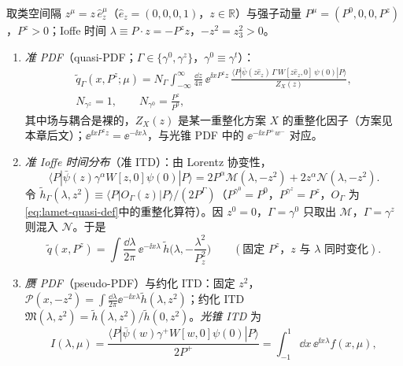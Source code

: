 \begin{definition}\label{def:lattice-quasi}
取类空间隔 $z^\mu=z\,\hat e_z^\mu$（$\hat e_z=(0,0,0,1)$，$z\in\mathbb R$）与强子动量 $P^\mu=(P^0,0,0,P^z)$，$P^z>0$；Ioffe 时间 $\lambda\equiv P\cdot z=-P^zz$，$-z^2=z_3^2>0$。
\begin{enumerate}[label=(\roman*),leftmargin=2em,itemsep=1pt,topsep=2pt]
\item \emph{准 PDF}（quasi-PDF；$\Gamma\in\{\gamma^0,\gamma^z\}$，$\gamma^0\equiv\gamma^t$）：
\begin{equation}\label{eq:lamet-quasi-def}
\begin{gathered}
\tilde q_\Gamma(x,P^z;\mu)=N_\Gamma\int_{-\infty}^{\infty}\frac{\dd z}{4\pi}\,\ee^{\ii xP^zz}\,\frac{\langle P|\bar\psi(z\hat e_z)\,\Gamma\,W[z\hat e_z,0]\,\psi(0)|P\rangle}{Z_X(z)},\\
N_{\gamma^z}=1,\qquad N_{\gamma^0}=\frac{P^z}{P^0},
\end{gathered}
\end{equation}
其中场与耦合是裸的，$Z_X(z)$ 是某一重整化方案 $X$ 的重整化因子（方案见本章后文）；$\ee^{\ii xP^zz}=\ee^{-\ii x\lambda}$，与光锥 PDF 中的 $\ee^{-\ii xP^+w^-}$ 对应。%
\item \emph{准 Ioffe 时间分布}（准 ITD）：由 Lorentz 协变性，
\[
\langle P|\bar\psi(z)\gamma^\alpha W[z,0]\psi(0)|P\rangle=2P^\alpha\mathcal M(\lambda,-z^2)+2z^\alpha\mathcal N(\lambda,-z^2).
\]
令 $\tilde h_\Gamma(\lambda,z^2)\equiv\langle P|O_\Gamma(z)|P\rangle/(2P^\Gamma)$（$P^{\gamma^0}=P^0$，$P^{\gamma^z}=P^z$，$O_\Gamma$ 为\cref{eq:lamet-quasi-def}中的重整化算符）。因 $z^0=0$，$\Gamma=\gamma^0$ 只取出 $\mathcal M$，$\Gamma=\gamma^z$ 则混入 $\mathcal N$。于是
\begin{equation}\label{eq:lamet-quasi-itd}
\tilde q(x,P^z)=\int\frac{\dd\lambda}{2\pi}\,\ee^{-\ii x\lambda}\,\tilde h\Big(\lambda,-\frac{\lambda^2}{P_z^2}\Big)\qquad(\text{固定 }P^z\text{，}z\text{ 与 }\lambda\text{ 同时变化}).
\end{equation}
\item \emph{赝 PDF}（pseudo-PDF）与约化 ITD：固定 $z^2$，$\mathcal P(x,-z^2)=\int\frac{\dd\lambda}{2\pi}\ee^{-\ii x\lambda}\tilde h(\lambda,z^2)$；约化 ITD $\mathfrak M(\lambda,z^2)=\tilde h(\lambda,z^2)/\tilde h(0,z^2)$。\emph{光锥 ITD} 为
\begin{equation}\label{eq:lamet-lc-itd}
I(\lambda,\mu)=\frac{\langle P|\bar\psi(w)\gamma^+W[w,0]\psi(0)|P\rangle}{2P^+}=\int_{-1}^1\dd x\,\ee^{\ii x\lambda}f(x,\mu),
\end{equation}

\end{enumerate}
\end{definition}
